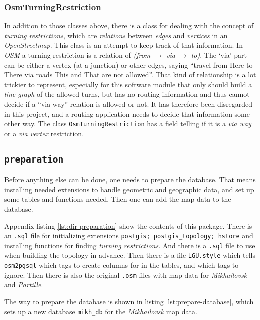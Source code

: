 \documentclass[../main.tex]{subfiles}
\begin{document}
\subsubsection{OsmTurningRestriction}\label{sect:osm-turning-restriction}
In addition to those classes above, there is a class for dealing with the concept of \textit{turning restrictions}, which are \textit{relations} between \textit{edges} and \textit{vertices} in an \textit{OpenStreetmap}. This class is an attempt to keep track of that information. In \textit{OSM} a turning restriction is a relation of \textit{(from $\rightarrow$ via $\rightarrow$ to)}. The `via' part can be either a vertex (at a junction) or other edges, saying ``travel from Here to There via roads This and That are not allowed''. That kind of relationship is a lot trickier to represent, especially for this software module that only should build a \textit{line graph} of the allowed turns, but has no routing information and thus cannot decide if a ``via way'' relation is allowed or not. It has therefore been disregarded in this project, and a routing application needs to decide that information some other way. The class \texttt{OsmTurningRestriction} has a field telling if it is a \textit{via way} or a \textit{via vertex} restriction.

\subsection{\texttt{preparation}}
Before anything else can be done, one needs to prepare the database. That means installing needed extensions to handle geometric and geographic data, and set up some tables and functions needed. Then one can add the map data to the database.

Appendix listing \ref{lst:dir-preparation} show the contents of this package. There is an \texttt{.sql} file for initializing extensions \texttt{postgis; postgis\_topology; hstore} and installing functions for finding \textit{turning restrictions}. And there is a \texttt{.sql} file to use when building the topology in advance. Then there is a file \texttt{LGU.style} which tells \texttt{osm2pgsql} which tags to create columns for in the tables, and which tags to ignore. Then there is also the original \texttt{.osm} files with map data for \textit{Mikhailovsk} and \textit{Partille}.

The way to prepare the database is shown in listing \ref{lst:prepare-database}, which sets up a new database \texttt{mikh\_db} for the \textit{Mikhailovsk} map data.
\end{document}
